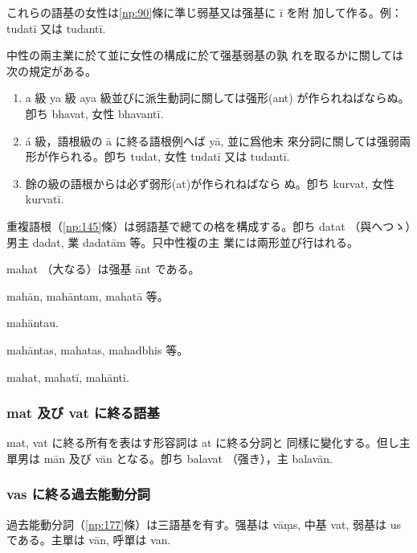 \numberParagraph \label{np:89}
これらの語基の女性は\ref{np:90}條に準じ弱基又は强基に ī を附
加して作る。例：tudatī 又は tudantī.

\numberParagraph \label{np:90}
中性の兩主業に於て並に女性の構成に於て强基弱基の孰
れを取るかに關しては次の規定がある。
\begin{enumerate}[label=(\alph*)]
\item a 級 ya 級 aya 級並びに派生動詞に關しては强形(ant)
  が作られねばならぬ。卽ち bhavat, 女性 bhavantī.
\item á 級，語根級の ā に終る語根例へば yā, 並に爲他未
  來分詞に關しては强弱兩形が作られる。卽ち tudat, 女性
  tudatī 又は tudantī.
\item 餘の級の語根からは必ず弱形(at)が作られねばなら
  ぬ。卽ち kurvat, 女性 kurvatī.
\end{enumerate}

\numberParagraph
重複語根（\ref{np:145}條）は弱語基で總ての格を構成する。卽ち
datat （與へつゝ）男主 dadat, 業 dadatām 等。只中性複の主
業には兩形並び行はれる。

\numberParagraph
mahat （大なる）は强基 ānt である。
\begin{description}[font=\normalfont]
\item[男，單] mahān, mahāntam, mahatā 等。
\item[兩] mahāntau.
\item[複] mahāntas, mahatas, mahadbhis 等。
\item[中] mahat, mahatī, mahānti.
\end{description}

\subsubsection{mat 及び vat に終る語基}

\numberParagraph
mat, vat に終る所有を表はす形容詞は at に終る分詞と
同樣に變化する。但し主單男は mān 及び vān となる。卽ち
balavat （强き），主 balavān.

\subsubsection{vas に終る過去能動分詞}

\numberParagraph \label{np:94}
過去能動分詞（\ref{np:177}條）は三語基を有す。强基は vāṃs,
中基 vat, 弱基は us である。主單は vān, 呼單は van.

